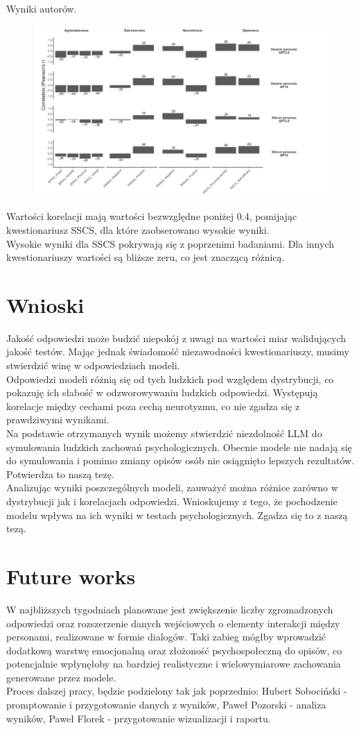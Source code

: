 \documentclass{article}
\begin{document}
\newpage
Wyniki autorów.

\begin{figure}[H]
    \centering
    \includegraphics[width=0.7 \linewidth]{./article_data/cross_corr.png}
\end{figure}

Wartości korelacji mają wartości bezwzględne poniżej 0.4, pomijając kwestionariusz SSCS, dla które zaobserowano wysokie wyniki. \\
Wysokie wyniki dla SSCS pokrywają się z poprzenimi badaniami. Dla innych kwestionariuszy wartości są bliższe zeru, co jest znaczącą różnicą.

\section{Wnioski}
Jakość odpowiedzi może budzić niepokój z uwagi na wartości miar walidujących jakość testów. Mając jednak świadomość niezawodności kwestionariuszy, musimy stwierdzić winę w odpowiedziach modeli. \\
Odpowiedzi modeli różnią się od tych ludzkich pod względem dystrybucji, co pokazuję ich słabość w odzworowywaniu ludzkich odpowiedzi. Występują korelacje między cechami poza cechą neurotyzmu, co nie zgadza się z prawdziwymi wynikami. \\
Na podstawie otrzymanych wynik możemy stwierdzić niezdolność LLM do symulowania ludzkich zachowań psychologicznych. Obecnie modele nie nadają się do symulowania i pomimo zmiany opisów osób nie osiągnięto lepszych rezultatów. Potwierdza to naszą tezę. \\
Analizując wyniki poszczególnych modeli, zauważyć można różnice zarówno w dystrybucji jak i korelacjach odpowiedzi. Wnioskujemy z tego, że pochodzenie modelu wpływa na ich wyniki w testach psychologicznych. Zgadza się to z naszą tezą.

\section{Future works}
W najbliższych tygodniach planowane jest zwiększenie liczby zgromadzonych odpowiedzi oraz rozszerzenie danych wejściowych o elementy interakcji między personami, realizowane w formie dialogów. 
Taki zabieg mógłby wprowadzić dodatkową warstwę emocjonalną oraz złożoność psychospołeczną do opisów, co potencjalnie wpłynęłoby na bardziej realistyczne i wielowymiarowe zachowania generowane przez modele.\\
Proces dalszej pracy, będzie podzielony tak jak poprzednio: Hubert Sobociński - promptowanie i przygotowanie danych z wyników, Paweł Pozorski - analiza wyników, Paweł Florek - przygotowanie wizualizacji i raportu.
\end{document}
